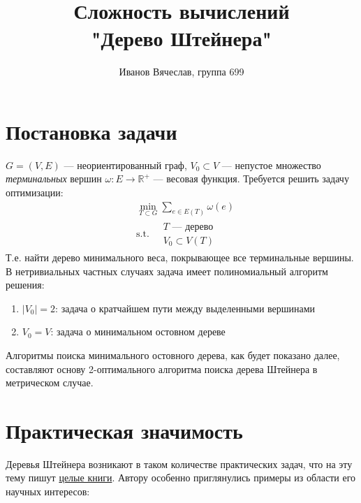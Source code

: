 \documentclass[11pt,a4paper]{report}
\title{Сложность вычислений\\"Дерево Штейнера"}
\author{Иванов Вячеслав, группа 699}
\def\Real{\mathbb{R}}
\theoremstyle{definition}
\theoremstyle{definition}
\theoremstyle{definition}
\begin{document}
	\setlength{\parindent}{1cm}
	{\let\newpage\relax\maketitle}
	\tableofcontents
	\newpage 
	\section{Постановка задачи}
		 $G = (V, E)$ — неориентированный граф, $V_0 \subset V$ — непустое множество \textit{терминальных} вершин $\omega : E \to \Real^{+}$ — весовая функция. Требуется решить задачу оптимизации:
		\begin{align*}
			&\min_{T \subset G} \sum_{e \in E(T)} \omega(e)\\
			&\text{s.t.}\ 
			\begin{aligned}
				&T \text{ — дерево}\\
				&V_0 \subset V(T)			
			\end{aligned}
		\end{align*}
		Т.е. найти дерево минимального веса, покрывающее все терминальные вершины.\\
		В нетривиальных частных случаях задача имеет полиномиальный алгоритм решения:
		\begin{enumerate}
			\item $|V_0| = 2$: задача о кратчайшем пути между выделенными вершинами
			\item $V_0 = V$: задача о минимальном остовном дереве
		\end{enumerate}
		Алгоритмы поиска минимального остовного дерева, как будет показано далее, составляют основу 2-оптимального алгоритма поиска дерева Штейнера в метрическом случае.
	\section{Практическая значимость}
		Деревья Штейнера возникают в таком количестве практических задач, что на эту тему пишут \href{https://www.springer.com/gp/book/9781402000997}{целые книги}. Автору особенно приглянулись примеры из области его научных интересов:
\end{document}
